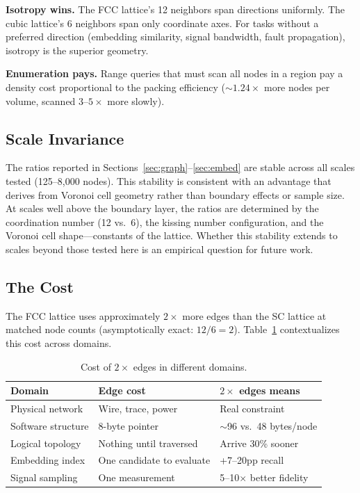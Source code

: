 \documentclass[11pt]{article}
\begin{document}
\textbf{Isotropy wins.} The FCC lattice's 12 neighbors span
directions uniformly. The cubic lattice's 6 neighbors span only
coordinate axes. For tasks without a preferred direction (embedding
similarity, signal bandwidth, fault propagation), isotropy is the
superior geometry.

\textbf{Enumeration pays.} Range queries that must scan all nodes
in a region pay a density cost proportional to the packing
efficiency (${\sim}1.24\times$ more nodes per volume, scanned
$3$--$5\times$ more slowly).

\subsection{Scale Invariance}

The ratios reported in Sections~\ref{sec:graph}--\ref{sec:embed}
are stable across all scales tested (125--8{,}000 nodes). This
stability is consistent with an advantage that derives from Voronoi
cell geometry rather than boundary effects or sample size. At scales
well above the boundary layer, the ratios are determined by the
coordination number (12 vs.\ 6), the kissing number configuration,
and the Voronoi cell shape---constants of the lattice. Whether
this stability extends to scales beyond those tested here is an
empirical question for future work.

\subsection{The Cost}

The FCC lattice uses approximately $2\times$ more edges than the
SC lattice at matched node counts (asymptotically exact: $12/6 = 2$).
Table~\ref{tab:cost} contextualizes this cost across domains.

\begin{table}[H]
\centering
\caption{Cost of $2\times$ edges in different domains.}
\label{tab:cost}
\begin{tabular}{lll}
\toprule
Domain & Edge cost & $2\times$ edges means \\
\midrule
Physical network & Wire, trace, power & Real constraint \\
Software structure & 8-byte pointer & ${\sim}$96 vs.\ 48 bytes/node \\
Logical topology & Nothing until traversed & Arrive 30\% sooner \\
Embedding index & One candidate to evaluate & +7--20pp recall \\
Signal sampling & One measurement & 5--10$\times$ better fidelity \\
\bottomrule
\end{tabular}
\end{table}
\end{document}
